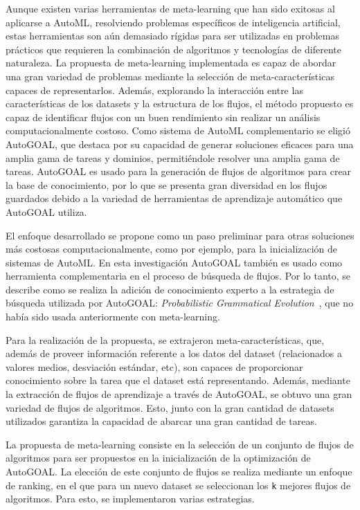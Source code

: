 \begin{conclusions}
Aunque existen varias herramientas de meta-learning que han sido exitosas al aplicarse a AutoML, resolviendo problemas específicos de inteligencia artificial, estas herramientas son aún demasiado rígidas para ser utilizadas en problemas prácticos que requieren la combinación de algoritmos y tecnologías de diferente naturaleza. La propuesta de meta-learning implementada es capaz de abordar una gran variedad de problemas mediante la selección de meta-características capaces de representarlos. Además, explorando la interacción entre las características de los datasets y la estructura de los flujos, el método propuesto es capaz de identificar flujos con un buen rendimiento sin realizar un análisis computacionalmente costoso. Como sistema de AutoML complementario se eligió AutoGOAL, que destaca por su capacidad de generar soluciones eficaces para una amplia gama de tareas y dominios, permitiéndole resolver una amplia gama de tareas. AutoGOAL es usado para la generación de flujos de algoritmos para crear la base de conocimiento, por lo que se presenta gran diversidad en los flujos guardados debido a la variedad de herramientas de aprendizaje automático que AutoGOAL utiliza.

El enfoque desarrollado se propone como un paso preliminar para otras soluciones más costosas computacionalmente, como por ejemplo, para la inicialización de sistemas de AutoML. En esta investigación AutoGOAL también es usado como herramienta complementaria en el proceso de búsqueda de flujos. Por lo tanto, se describe como se realiza la adición de conocimiento experto a la estrategia de búsqueda utilizada por AutoGOAL: \textit{Probabilistic Grammatical Evolution}~\cite{pge2015}, que no había sido usada anteriormente con meta-learning.

Para la realización de la propuesta, se extrajeron meta-características, que, además de proveer información referente a los datos del dataset (relacionados a valores medios, desviación estándar, etc), son capaces de proporcionar conocimiento sobre la tarea que el dataset está representando. Además, mediante la extracción de flujos de aprendizaje a través de AutoGOAL, se obtuvo una gran variedad de flujos de algoritmos. Esto, junto con la gran cantidad de datasets utilizados garantiza la capacidad de abarcar una gran cantidad de tareas.

La propuesta de meta-learning consiste en la selección de un conjunto de flujos de algoritmos para ser propuestos en la inicialización de la optimización de AutoGOAL. La elección de este conjunto de flujos se realiza mediante un enfoque de ranking, en el que para un nuevo dataset se seleccionan los \texttt{k} mejores flujos de algoritmos. Para esto, se implementaron varias estrategias.


\end{conclusions}
